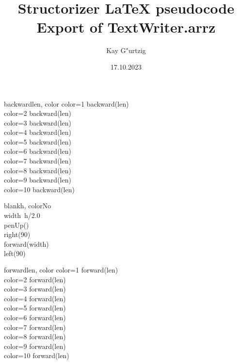 \documentclass[a4paper,10pt]{article}
\title{Structorizer LaTeX pseudocode Export of TextWriter.arrz}
\author{Kay G"urtzig}
\date{17.10.2023}
\begin{document}
\begin{pseudocode}{backward}{len, color }
\label{backward}
  \IF color=1 \THEN
    backward(len)\\
  \ELSEIF color=2 \THEN
    backward(len)\\
  \ELSEIF color=3 \THEN
    backward(len)\\
  \ELSEIF color=4 \THEN
    backward(len)\\
  \ELSEIF color=5 \THEN
    backward(len)\\
  \ELSEIF color=6 \THEN
    backward(len)\\
  \ELSEIF color=7 \THEN
    backward(len)\\
  \ELSEIF color=8 \THEN
    backward(len)\\
  \ELSEIF color=9 \THEN
    backward(len)\\
  \ELSEIF color=10 \THEN
    backward(len)\\
\ENDPROCEDURE
\end{pseudocode}


\begin{pseudocode}{blank}{h, colorNo }
\label{blank}
\\
  width\gets\ h/2.0\\
  penUp()\\
  right(90)\\
  forward(width)\\
  left(90)\\
\ENDPROCEDURE
\end{pseudocode}


\begin{pseudocode}{forward}{len, color }
\label{forward}
  \IF color=1 \THEN
    forward(len)\\
  \ELSEIF color=2 \THEN
    forward(len)\\
  \ELSEIF color=3 \THEN
    forward(len)\\
  \ELSEIF color=4 \THEN
    forward(len)\\
  \ELSEIF color=5 \THEN
    forward(len)\\
  \ELSEIF color=6 \THEN
    forward(len)\\
  \ELSEIF color=7 \THEN
    forward(len)\\
  \ELSEIF color=8 \THEN
    forward(len)\\
  \ELSEIF color=9 \THEN
    forward(len)\\
  \ELSEIF color=10 \THEN
    forward(len)\\
\ENDPROCEDURE
\end{pseudocode}
\end{document}
